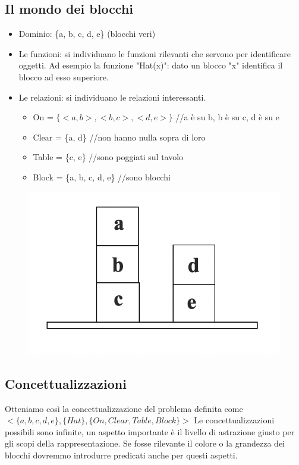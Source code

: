 \documentclass{article}
\begin{document}
\subsection{Il mondo dei blocchi}
\begin{itemize}
    \item Dominio: \{a, b, c, d, e\} (blocchi veri)
    \item Le funzioni: si individuano le funzioni rilevanti che servono per identificare oggetti. Ad esempio la funzione "Hat(x)": dato un blocco "x" identifica il blocco ad esso superiore.
    \item Le relazioni: si individuano le relazioni interessanti. 
        \begin{itemize}
            \item On = $\{<a, b>, <b, c>, <d, e>\}$ //a è su b, b è su c, d è su e
            \item Clear = \{a, d\} //non hanno nulla sopra di loro
            \item Table = \{c, e\} //sono poggiati sul tavolo
            \item Block = \{a, b, c, d, e\} //sono blocchi
    \end{itemize} 
\end{itemize}
\begin{figure}[h!]
\centering
\includegraphics[scale=0.4]{Images/blocks.png}
\end{figure}

\subsection{Concettualizzazioni}
Otteniamo così la concettualizzazione del problema definita come \newline 
$<\{a, b, c, d, e\}, \{Hat\}, \{On, Clear, Table, Block\}>$ \newline
Le concettualizzazioni possibili sono infinite, un aspetto importante è il livello di astrazione giusto per gli scopi della rappresentazione. Se fosse rilevante il colore o la grandezza dei blocchi dovremmo introdurre predicati anche per questi aspetti.
\end{document}
